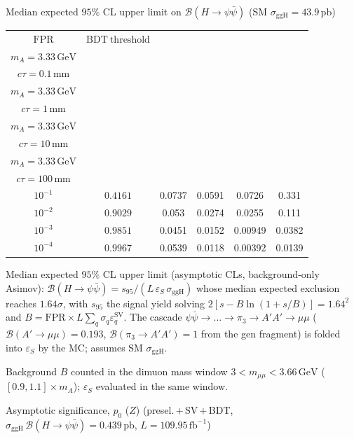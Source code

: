 \documentclass[10pt,a4paper]{article}
\begin{document}
{\vspace{12pt}

Median expected $95\%$ CL upper limit on $\mathcal{B}(H\to\psi\bar{\psi})$ (SM $\sigma_{\mathrm{ggH}}=43.9\,\mathrm{pb}$)

\begin{tabular}{cccccc}
\toprule
$\mathrm{FPR}$ & $\mathrm{BDT\ threshold}$ & \shortstack{$m_{\pi}=10\,\mathrm{GeV}$\\$m_{A}=3.33\,\mathrm{GeV}$\\$c\tau=0.1\,\mathrm{mm}$} & \shortstack{$m_{\pi}=10\,\mathrm{GeV}$\\$m_{A}=3.33\,\mathrm{GeV}$\\$c\tau=1\,\mathrm{mm}$} & \shortstack{$m_{\pi}=10\,\mathrm{GeV}$\\$m_{A}=3.33\,\mathrm{GeV}$\\$c\tau=10\,\mathrm{mm}$} & \shortstack{$m_{\pi}=10\,\mathrm{GeV}$\\$m_{A}=3.33\,\mathrm{GeV}$\\$c\tau=100\,\mathrm{mm}$} \\
\midrule
$10^{-1}$ & $0.4161$ & 0.0737 & 0.0591 & 0.0726 & 0.331\\
$10^{-2}$ & $0.9029$ & 0.053 & 0.0274 & 0.0255 & 0.111\\
$10^{-3}$ & $0.9851$ & 0.0451 & 0.0152 & 0.00949 & 0.0382\\
$10^{-4}$ & $0.9967$ & 0.0539 & 0.0118 & 0.00392 & 0.0139\\
\bottomrule
\end{tabular}

{\small Median expected $95\%$ CL upper limit (asymptotic CLs, background-only Asimov): $\mathcal{B}(H\to\psi\bar{\psi})=s_{95}/(L\,\varepsilon_S\,\sigma_{\mathrm{ggH}})$ whose median expected exclusion reaches $1.64\sigma$, with $s_{95}$ the signal yield solving $2[s-B\ln(1{+}s/B)]=1.64^2$ and $B=\mathrm{FPR}\times L\sum_q\sigma_q\varepsilon_q^{\mathrm{SV}}$. The cascade $\psi\bar{\psi}\to\ldots\to\pi_3\to A'A'\to\mu\mu$ ($\mathcal{B}(A'\to\mu\mu)=0.193$, $\mathcal{B}(\pi_3\to A'A')=1$ from the gen fragment) is folded into $\varepsilon_S$ by the MC; assumes SM $\sigma_{\mathrm{ggH}}$.}

{\small Background $B$ counted in the dimuon mass window $3<m_{\mu\mu}<3.66\,\mathrm{GeV}$ ($[0.9,1.1]\times m_A$); $\varepsilon_S$ evaluated in the same window.}

\vspace{12pt}

Asymptotic significance, $p_0$ ($Z$) (presel.\,$+$\,SV\,$+$\,BDT, $\sigma_{\mathrm{ggH}}\,\mathcal{B}(H\to\psi\bar{\psi})=0.439\,\mathrm{pb}$, $L=109.95\,\mathrm{fb}^{-1}$)

}
\end{document}
